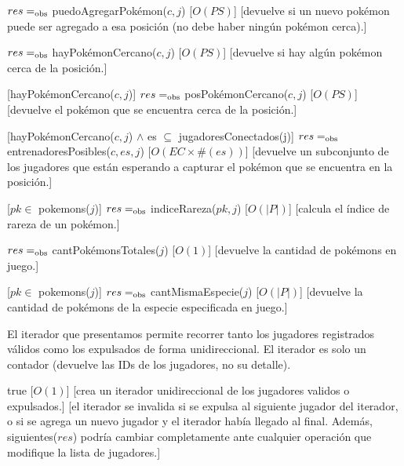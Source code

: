 \begin{Interfaz}
	{$res =_{\mathrm{obs}}$ puedoAgregarPokémon($c,j$)}
	[$O(PS)$]
	[devuelve si un nuevo pokémon puede ser agregado a esa posición (no debe haber ningún pokémon cerca).]

	{$res =_{\mathrm{obs}}$ hayPokémonCercano($c,j$)}
	[$O(PS)$]
	[devuelve si hay algún pokémon cerca de la posición.]

	[hayPokémonCercano($c,j$)]
	{$res =_{\mathrm{obs}}$ posPokémonCercano($c,j$)}
	[$O(PS)$]
	[devuelve el pokémon que se encuentra cerca de la posición.]

	[hayPokémonCercano($c,j$) $\land$ es $\subseteq$ jugadoresConectados(j)]
	{$res =_{\mathrm{obs}}$ entrenadoresPosibles($c, es, j$)}
	[$O(EC \times \#(es))$]
	[devuelve un subconjunto de los jugadores que están esperando a capturar el pokémon que se encuentra en la posición.]

	[$pk \in$ pokemons($j$)]
	{$res =_{\mathrm{obs}}$ indiceRareza($pk,j$)}
	[$O(|P|)$]
	[calcula el índice de rareza de un pokémon.]

	{$res =_{\mathrm{obs}}$ cantPokémonsTotales($j$)}
	[$O(1)$]
	[devuelve la cantidad de pokémons en juego.]

	[$pk \in$ pokemons($j$)]
	{$res =_{\mathrm{obs}}$ cantMismaEspecie($j$)}
	[$O(|P|)$]
	[devuelve la cantidad de pokémons de la especie especificada en juego.]


	El iterador que presentamos permite recorrer tanto los jugadores registrados válidos como los expulsados de forma unidireccional. El iterador es solo un contador (devuelve las IDs de los jugadores, no su detalle).


	{true}
	[$O(1)$]
	[crea un iterador unidireccional de los jugadores validos o expulsados.]
	[el iterador se invalida si se expulsa al siguiente jugador del iterador, o si se agrega un nuevo jugador y el iterador había llegado al final. Además, siguientes($res$) podría cambiar completamente ante cualquier operación que modifique la lista de jugadores.]


\end{Interfaz}
